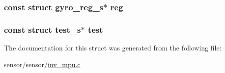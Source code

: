 \subsubsection[{\texorpdfstring{reg}{reg}}]{\setlength{\rightskip}{0pt plus 5cm}const struct {\bf gyro\+\_\+reg\+\_\+s}$\ast$ reg}\hypertarget{structgyro__state__s_ae857e1285c583b7438a208edd691a38e}{}\label{structgyro__state__s_ae857e1285c583b7438a208edd691a38e}
\subsubsection[{\texorpdfstring{test}{test}}]{\setlength{\rightskip}{0pt plus 5cm}const struct {\bf test\+\_\+s}$\ast$ test}\hypertarget{structgyro__state__s_a4dc7fb069be996a5f40e25c01338a3ca}{}\label{structgyro__state__s_a4dc7fb069be996a5f40e25c01338a3ca}


The documentation for this struct was generated from the following file\+:\begin{DoxyCompactItemize}
\item 
sensor/sensor/\hyperlink{inv__mpu_8c}{inv\+\_\+mpu.\+c}\end{DoxyCompactItemize}

